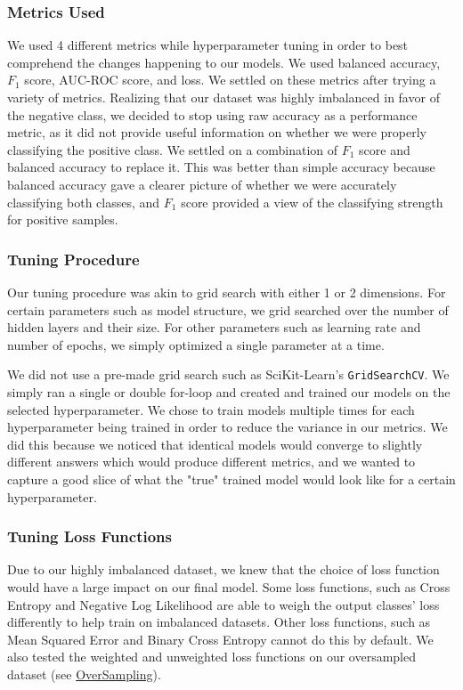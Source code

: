 \documentclass{article}
\begin{document}
\subsubsection{Metrics Used}
\label{sssec:metrics}
We used 4 different metrics while hyperparameter tuning in order to best comprehend the changes happening to our models. We used balanced
accuracy, $F_1$ score, AUC-ROC score, and loss. We settled on these metrics after trying a variety of metrics. Realizing that our dataset 
was highly imbalanced in favor of the negative class, we decided to stop using raw accuracy as a performance metric, as it did not provide 
useful information on whether we were properly classifying the positive class. We settled on a combination of $F_1$ score and balanced 
accuracy to replace it. This was better than simple accuracy because balanced accuracy gave a clearer picture of whether we were accurately
classifying both classes, and $F_1$ score provided a view of the classifying strength for positive samples. 

\subsubsection{Tuning Procedure}
Our tuning procedure was akin to grid search with either 1 or 2 dimensions. For certain parameters such as model structure, we grid
searched over the number of hidden layers and their size. For other parameters such as learning rate and number of epochs, we simply 
optimized a single parameter at a time.

We did not use a pre-made grid search such as SciKit-Learn's \verb|GridSearchCV|. We simply ran a single or double for-loop and created 
and trained our models on the selected hyperparameter. We chose to train models multiple times for each hyperparameter being trained in 
order to reduce the variance in our metrics. We did this because we noticed that identical models would converge to slightly different 
answers which would produce different metrics, and we wanted to capture a good slice of what the "true" trained model would look like 
for a certain hyperparameter. 

\subsubsection{Tuning Loss Functions}
\label{sssec:loss}
Due to our highly imbalanced dataset, we knew that the choice of loss function would have a large impact on our final model. Some loss 
functions, such as Cross Entropy and Negative Log Likelihood are able to weigh the output classes' loss differently to help train on 
imbalanced datasets. Other loss functions, such as Mean Squared Error and Binary Cross Entropy cannot do this by default. We also tested
the weighted and unweighted loss functions on our oversampled dataset (see \hyperref[sssec:ovrsmpl]{OverSampling}). 
\end{document}
